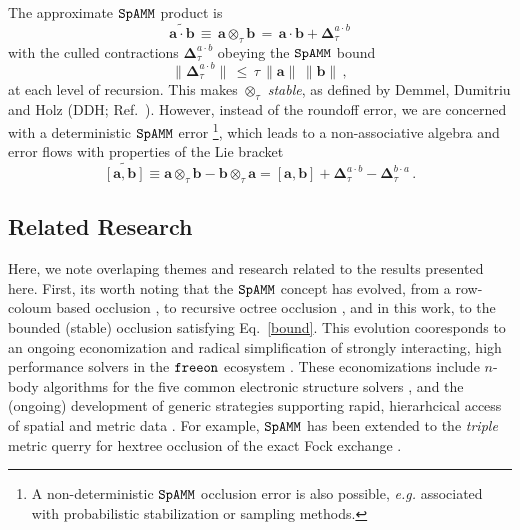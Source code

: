 \documentclass[letterpaper,twocolumn,amsmath,amsfont,amssymb,english,aps,jcp,preprintnumbers,groupaddress,nofootinbib,tightenlines]{revtex4}
\newcommand{\mat}[1]{\boldsymbol{#1}}
\newcommand{\ot}{ {\scriptstyle \otimes}_{ \tau } }
\begin{document}
The approximate $\tt SpAMM$ product is
\begin{equation}
\widetilde{\mat{a}\cdot \mat{b}} \,  \equiv \, \mat{a} \ot \mat{b} \,
  = \, \mat{a} \cdot \mat{b} + \mat{\Delta}^{a \cdot b}_{\tau}
\end{equation}
with the culled contractions $\mat{\Delta}^{a \cdot b}_{\tau}$ obeying
the $\tt SpAMM$ bound
\begin{equation}\label{bound}
\lVert \mat{\Delta}^{a \cdot b}_{\tau} \rVert \, \leq \, \tau \, \lVert \mat{a} \rVert  \,  \lVert \mat{b} \rVert \, ,
\end{equation}
at each level of recursion.  This makes $\ot$ {\em stable}, as defined
by Demmel, Dumitriu and Holz (DDH; Ref.~\cite{Demmel07}).  However,
instead of the roundoff error, we are concerned with a deterministic
$\tt SpAMM$ error%
\footnote{A non-deterministic ${\tt SpAMM}$ occlusion error is also
  possible, {\em e.g.} associated with probabilistic stabilization
  \cite{} or sampling \cite{} methods.},
which leads to a non-associative algebra and error flows with
properties of the Lie bracket
\begin{equation} \label{braket}
\widetilde{\left[ \mat{a} , \mat{b} \right]} \equiv \mat{a} \ot \mat{b}-\mat{b} \ot \mat{a}
=  \left[ \mat{a} , \mat{b} \right]
+ \mat{\Delta}^{a\cdot b}_{\tau} -\mat{\Delta}^{b\cdot a}_{\tau} \,.
\end{equation}

\subsection{Related Research} 

Here, we note overlaping themes and research related to the results presented here.
First,  its worth noting that the $\tt SpAMM$ concept has evolved, 
from a row-coloum based occlusion \cite{}, to recursive octree occlusion \cite{}, and in this work, to the
bounded (stable) occlusion satisfying Eq.~\ref{bound}.    This evolution cooresponds to an  ongoing economization and radical simplification
of strongly interacting,  high performance solvers in the $\tt freeon$ ecosystem \cite{}.  These economizations 
include $n$-body algorithms for the five common electronic structure solvers \cite{}, 
and the (ongoing) development of generic strategies supporting rapid, hierarhcical access of spatial and metric data \cite{sammet, wise}.  
For example, $\tt SpAMM$ has been extended to the {\em triple} metric querry for hextree occlusion of 
the exact Fock exchange \cite{}.  
\end{document}
